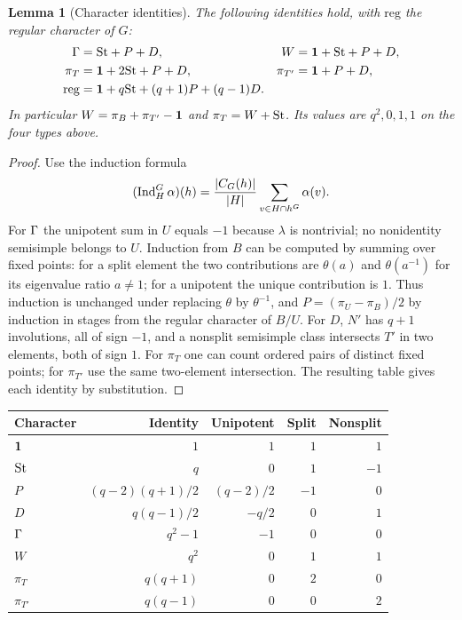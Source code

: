 \documentclass[11pt]{article}
\newtheorem{lemma}[theorem]{Lemma}
\theoremstyle{remark}\newtheorem{remark}[theorem]{Remark}
\begin{document}
\begin{lemma}[Character identities]\label{lem:identities}
The following identities hold, with $\mathrm{reg}$ the regular character of $G$:
\begin{align}
 \Gamma&=\mathrm{St}+P+D, & W&=\mathbf 1+\mathrm{St}+P+D,\label{eq:gamma}\\
 \pi_T&=\mathbf 1+2\mathrm{St}+P+D, & \pi_{T'}&=\mathbf 1+P+D,\label{eq:perms}\\
 \mathrm{reg}&=\mathbf 1+q\mathrm{St}+(q+1)P+(q-1)D.\label{eq:reg}
\end{align}
In particular $W=\pi_B+\pi_{T'}-\mathbf 1$ and $\pi_T=W+\mathrm{St}$. Its values are $q^2,0,1,1$ on the four types above.
\end{lemma}
\begin{proof}
Use the induction formula
\[
 (\operatorname{Ind}_H^G\alpha)(h)=\frac{|C_G(h)|}{|H|}
       \sum_{v\in H\cap h^G}\alpha(v).
\]
For $\Gamma$ the unipotent sum in $U$ equals $-1$ because $\lambda$ is nontrivial; no nonidentity semisimple belongs to $U$. Induction from $B$ can be computed by summing over fixed points: for a split element the two contributions are $\theta(a)$ and $\theta(a^{-1})$ for its eigenvalue ratio $a\ne1$; for a unipotent the unique contribution is $1$. Thus induction is unchanged under replacing $\theta$ by $\theta^{-1}$, and $P=(\pi_U-\pi_B)/2$ by induction in stages from the regular character of $B/U$. For $D$, $N'$ has $q+1$ involutions, all of sign $-1$, and a nonsplit semisimple class intersects $T'$ in two elements, both of sign $1$. For $\pi_T$ one can count ordered pairs of distinct fixed points; for $\pi_{T'}$ use the same two-element intersection. The resulting table gives each identity by substitution.
\end{proof}
\begin{center}\small
\begin{tabular}{@{}lrrrr@{}}\toprule
Character & Identity & Unipotent & Split & Nonsplit\\\midrule
$\mathbf 1$ & $1$ & $1$ & $1$ & $1$\\
$\mathrm{St}$ & $q$ & $0$ & $1$ & $-1$\\
$P$ & $(q-2)(q+1)/2$ & $(q-2)/2$ & $-1$ & $0$\\
$D$ & $q(q-1)/2$ & $-q/2$ & $0$ & $1$\\
$\Gamma$ & $q^2-1$ & $-1$ & $0$ & $0$\\
$W$ & $q^2$ & $0$ & $1$ & $1$\\
$\pi_T$ & $q(q+1)$ & $0$ & $2$ & $0$\\
$\pi_{T'}$ & $q(q-1)$ & $0$ & $0$ & $2$\\\bottomrule
\end{tabular}
\end{center}
\end{document}
